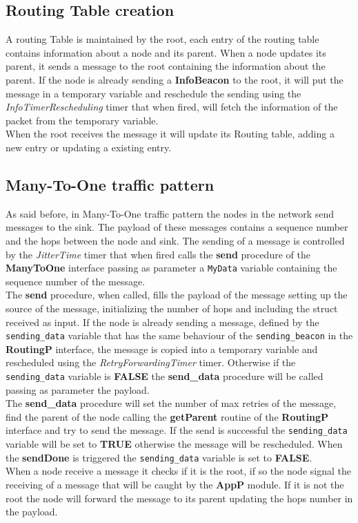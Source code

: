 \documentclass{article}
\begin{document}
\subsection{Routing Table creation}
    A routing Table is maintained by the root, each entry of the routing table contains information about a node and its parent. When a node updates its parent, it sends a message to the root containing the information about the parent. If the node is already sending a \textbf{InfoBeacon} to the root, it will put the message in a temporary variable and reschedule the sending using the \emph{InfoTimerRescheduling} timer that when fired, will fetch the information of the packet from the temporary variable. \\
    When the root receives the message it will update its Routing table, adding a new entry or updating a existing entry.
    \subsection{Many-To-One traffic pattern}
    As said before, in Many-To-One traffic pattern the nodes in the network send messages to the sink. The payload of these messages contains a sequence number and the hops between the node and sink. The sending of a message is controlled by the \emph{JitterTime} timer that when fired calls the \textbf{send} procedure of the \textbf{ManyToOne} interface passing as parameter a \texttt{MyData} variable containing the sequence number of the message. \\
    The \textbf{send} procedure, when called, fills the payload of the message setting up the source of the message, initializing the number of hops and including the struct received as input. If the node is already sending a message, defined by the \texttt{sending\_data} variable that has the same behaviour of the \texttt{sending\_beacon} in the \textbf{RoutingP} interface, the message is copied into a temporary variable and rescheduled using the \emph{RetryForwardingTimer} timer. Otherwise if the \texttt{sending\_data} variable is \textbf{FALSE} the \textbf{send\_data} procedure will be called passing as parameter the payload. \\
    The \textbf{send\_data} procedure will set the number of max retries of the message, find the parent of the node calling the \textbf{getParent} routine of the \textbf{RoutingP} interface and try to send the message. If the send is successful the \texttt{sending\_data} variable will be set to \textbf{TRUE} otherwise the message will be rescheduled. When the \textbf{sendDone} is triggered the \texttt{sending\_data} variable is set to \textbf{FALSE}.\\
    When a node receive a message it checks if it is the root, if so the node signal the receiving of a message that will be caught by the \textbf{AppP} module. If it is not the root the node will forward the message to its parent updating the hops number in the payload.
\end{document}
